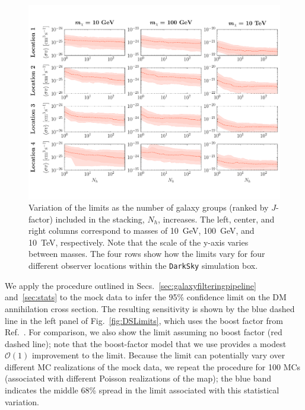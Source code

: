  \begin{figure}[t]
   \centering
   \includegraphics[width=1.0\textwidth]{ch-darksky/plots//darksky_elephants.pdf}
   \caption{Variation of the limits as the number of galaxy groups (ranked by $J$-factor) included in the stacking, $N_h$, increases. The left, center, and right columns correspond to masses of 10~GeV, 100~GeV, and 10~TeV, respectively. Note that the scale of the y-axis varies between masses.  The four rows show how the limits vary for four different observer locations within the \texttt{DarkSky} simulation box.  }
   \label{fig:DSelephants}
\end{figure}
We apply the procedure outlined in Secs.~\ref{sec:galaxyfilteringpipeline} and~\ref{sec:stats} to  the mock data to infer the 95\% confidence limit on the DM annihilation cross section.  The resulting sensitivity is shown by the blue dashed line in the left panel of Fig.~\ref{fig:DSLimits}, which uses the boost factor from Ref.~\cite{Bartels:2015uba}.  For comparison, we also show the limit assuming no boost factor (red dashed line); note that the boost-factor model that we use provides a modest $\mathcal{O}(1)$ improvement to the limit.  Because the limit can potentially vary over different MC realizations of the mock data, we repeat the procedure for 100 MCs (associated with different Poisson realizations of the map); the blue band indicates the middle 68\% spread in the limit associated with this statistical variation.

